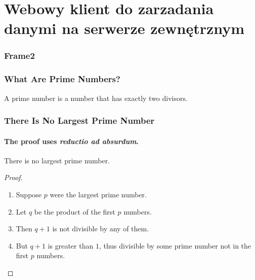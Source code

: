 \documentclass{beamer}
\begin{document}
\section{Webowy klient do zarzadania danymi na serwerze zewnętrznym}
\begin{frame}
\frametitle{Frame2}
\end{frame}
\begin{frame}
\frametitle{What Are Prime Numbers?}
\begin{definition}
A \alert{prime number} is a number that has exactly two divisors.
\end{definition}
\end{frame}

\begin{frame}
\frametitle{There Is No Largest Prime Number}
\framesubtitle{The proof uses \textit{reductio ad absurdum}.}
\begin{theorem}
There is no largest prime number.
\end{theorem}
\begin{proof}
\begin{enumerate}
\item<1-> Suppose $p$ were the largest prime number.
\item<2-> Let $q$ be the product of the first $p$ numbers.
\item<3-> Then $q + 1$ is not divisible by any of them.
\item<1-> But $q + 1$ is greater than $1$, thus divisible by some prime
number not in the first $p$ numbers.\qedhere
\end{enumerate}
\end{proof}
\end{frame}
\end{document}
